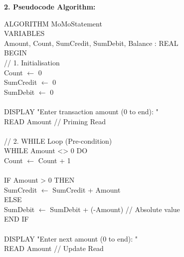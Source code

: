 \documentclass[11pt]{article}
\begin{document}
\begin{exoresolu}
\noindent\textbf{2. Pseudocode Algorithm:}
\begin{flushleft}
\ttfamily\small
ALGORITHM MoMoStatement\\
VARIABLES\\
\hspace{1em}Amount, Count, SumCredit, SumDebit, Balance : REAL\\
BEGIN\\
\hspace{1em}// 1. Initialisation\\
\hspace{1em}Count $\leftarrow$ 0\\
\hspace{1em}SumCredit $\leftarrow$ 0\\
\hspace{1em}SumDebit $\leftarrow$ 0\\
\mbox{}\\
\hspace{1em}DISPLAY "Enter transaction amount (0 to end): "\ \\
\hspace{1em}READ Amount \hspace{2em}// Priming Read\\
\mbox{}\\
\hspace{1em}// 2. WHILE Loop (Pre-condition)\\
\hspace{1em}WHILE Amount <> 0 DO\\
\hspace{2em}Count $\leftarrow$ Count + 1\\
\mbox{}\\
\hspace{2em}IF Amount > 0 THEN\\
\hspace{3em}SumCredit $\leftarrow$ SumCredit + Amount\\
\hspace{2em}ELSE\\
\hspace{3em}SumDebit $\leftarrow$ SumDebit + (-Amount) \hspace{1em}// Absolute value\\
\hspace{2em}END IF\\
\mbox{}\\
\hspace{2em}DISPLAY "Enter next amount (0 to end): "\ \\
\hspace{2em}READ Amount \hspace{2em}// Update Read\\

\end{flushleft}
\end{exoresolu}
\end{document}
